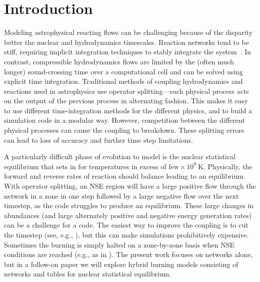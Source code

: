 \documentclass[times,preprint]{aastex631}
\begin{document}

\section{Introduction}\label{Sec:Introduction}

Modeling astrophysical reacting flows can be challenging because of
the disparity better the nuclear and hydrodynamics timescales.
Reaction networks tend to be stiff, requiring implicit integration
techniques to stably integrate the system~\citep{BYRNE19871}.  In contrast, compressible
hydrodynamics flows are limited by the (often much longer)
sound-crossing time over a computational cell and can be solved using
explicit time integration. Traditional methods of coupling
hydrodynamics and reactions used in astrophysics use operator
splitting---each physical process acts on the output of the previous
process in alternating fashion.  This makes it easy to use different
time-integration methods for the different physics, and to build a
simulation code in a modular way.  However, competition between the
different physical processes can cause the coupling to breakdown.
These splitting errors can lead to loss of accuracy and further time
step limitations.

A particularly difficult phase of evolution to model is the nuclear
statistical equilibrium that sets in for temperatures in excess of
$\mbox{few} \times 10^9~\mathrm{K}$.  Physically, the forward and
reverse rates of reaction should balance leading to an equilibrium.
With operator splitting, an NSE region will have a large positive flow
through the network in a zone in one step followed by a large negative
flow over the next timestep, as the code struggles to produce an
equilibrium.  These large changes in abundances (and large alternately
positive and negative energy generation rates) can be a challenge for
a code.  The easiest way to improve the coupling is to cut the
timestep (see, e.g., \citealt{couch:2015}), but this can make simulations
prohibitively expensive.  Sometimes the burning is simply halted on a
zone-by-zone basis when NSE conditions are reached (e.g., as in
\citealt{hedet}).  The
present work focuses on networks alone, but in a follow-on paper we
will explore hybrid burning models consisting of networks and tables for
nuclear statistical equilibrium.
\end{document}
